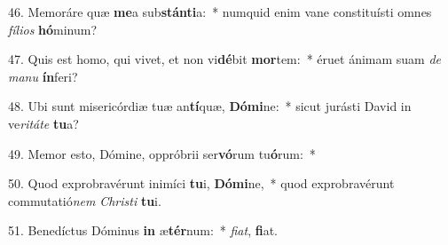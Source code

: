 46. Memoráre quæ \textbf{me}a sub\textbf{stán}\textbf{ti}a:~*  numquid enim vane constituísti omnes \textit{fí}\textit{li}\textit{os} \textbf{hó}minum?\

47. Quis est homo, qui vivet, et non vi\textbf{dé}bit \textbf{mor}tem:~*  éruet ánimam suam \textit{de} \textit{ma}\textit{nu} \textbf{ín}feri?\

48. Ubi sunt misericórdiæ tuæ an\textbf{tí}quæ, \textbf{Dó}\textbf{mi}ne:~*  sicut jurásti David in ve\textit{ri}\textit{tá}\textit{te} \textbf{tu}a?\

49. Memor esto, Dómine, oppróbrii ser\textbf{vó}rum tu\textbf{ó}rum:~*  \

50. Quod exprobravérunt inimíci \textbf{tu}i, \textbf{Dó}\textbf{mi}ne,~*  quod exprobravérunt commutatió\textit{nem} \textit{Chris}\textit{ti} \textbf{tu}i.\

51. Benedíctus Dóminus \textbf{in} æ\textbf{tér}num:~*  \textit{fi}\textit{at}, \textbf{fi}at.\

